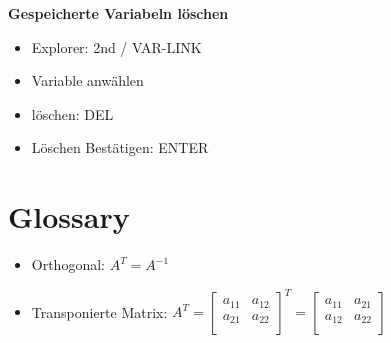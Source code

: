 \documentclass[a4paper, 10pt]{scrartcl}
\begin{document}
\textbf{Gespeicherte Variabeln löschen}
\begin{itemize}
	\item Explorer: 2nd / VAR-LINK
	\item Variable anwählen
	\item löschen: DEL
	\item Löschen Bestätigen: ENTER
\end{itemize}

\section{Glossary}
\begin{itemize}
	\item Orthogonal: $A^T = A^{-1}$
	\item Transponierte Matrix: $A^T = \begin{bmatrix}
	a_{11}&a_{12}\\
	a_{21}&a_{22}\\
	\end{bmatrix}^T = \begin{bmatrix}
	a_{11}&a_{21}\\
	a_{12}&a_{22}\\
	\end{bmatrix}$
\end{itemize}
\end{document}
